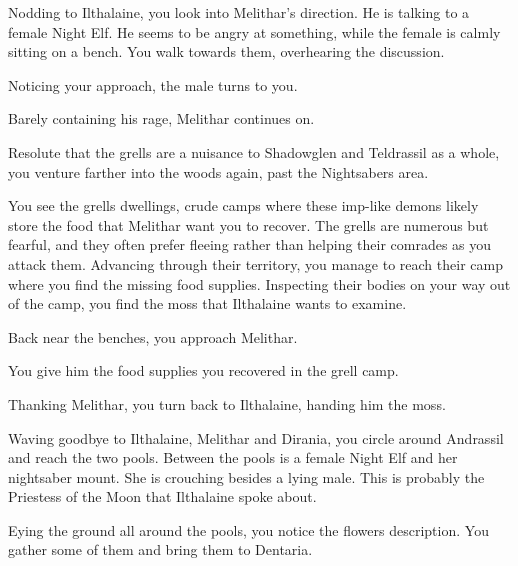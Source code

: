 Nodding to Ilthalaine, you look into Melithar's direction. He is talking to a female Night Elf. He seems to be angry at something, while the female is calmly sitting on a bench. You walk towards them, overhearing the discussion.


Noticing your approach, the male turns to you.


Barely containing his rage, Melithar continues on.


Resolute that the grells are a nuisance to Shadowglen and Teldrassil as a whole, you venture farther into the woods again, past the Nightsabers area.

You see the grells dwellings, crude camps where these imp-like demons likely store the food that Melithar want you to recover. The grells are numerous but fearful, and they often prefer fleeing rather than helping their comrades as you attack them. Advancing through their territory, you manage to reach their camp where you find the missing food supplies. Inspecting their bodies on your way out of the camp, you find the moss that Ilthalaine wants to examine.

Back near the benches, you approach Melithar.


You give him the food supplies you recovered in the grell camp.


Thanking Melithar, you turn back to Ilthalaine, handing him the moss.



Waving goodbye to Ilthalaine, Melithar and Dirania, you circle around Andrassil and reach the two pools. Between the pools is a female Night Elf and her nightsaber mount. She is crouching besides a lying male. This is probably the Priestess of the Moon that Ilthalaine spoke about.



Eying the ground all around the pools, you notice the flowers description. You gather some of them and bring them to Dentaria.

